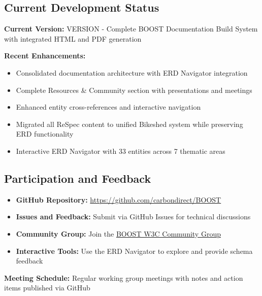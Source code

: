 \subsection{Current Development Status}
\label{sec:development-status}

\begin{important}[title=Current Version Information]
\textbf{Current Version:} {{VERSION}} - Complete BOOST Documentation Build System with integrated HTML and PDF generation

\textbf{Recent Enhancements:}
\begin{itemize}
    \item Consolidated documentation architecture with ERD Navigator integration
    \item Complete Resources \& Community section with presentations and meetings
    \item Enhanced entity cross-references and interactive navigation  
    \item Migrated all ReSpec content to unified Bikeshed system while preserving ERD functionality
    \item Interactive ERD Navigator with 33 entities across 7 thematic areas
\end{itemize}
\end{important}

\subsection{Participation and Feedback}
\label{sec:participation}

\begin{informative}[title=How to Contribute]
\begin{itemize}
    \item \textbf{GitHub Repository:} \url{https://github.com/carbondirect/BOOST}
    \item \textbf{Issues and Feedback:} Submit via GitHub Issues for technical discussions
    \item \textbf{Community Group:} Join the \href{https://www.w3.org/community/boost-01/}{BOOST W3C Community Group}
    \item \textbf{Interactive Tools:} Use the ERD Navigator to explore and provide schema feedback
\end{itemize}

\textbf{Meeting Schedule:} Regular working group meetings with notes and action items published via GitHub
\end{informative}